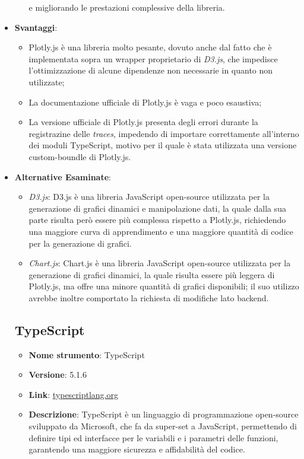 \begin{itemize}
\begin{itemize}
          e migliorando le prestazioni complessive della libreria.
\end{itemize}
\item \textbf{Svantaggi}:
\begin{itemize}
    \item Plotly.js è una libreria molto pesante, dovuto anche dal fatto che è implementata sopra un wrapper proprietario di \textit{D3.js},
          che impedisce l'ottimizzazione di alcune dipendenze non necessarie in quanto non utilizzate;
    \item La documentazione ufficiale di Plotly.js è vaga e poco esaustiva;
    \item La versione ufficiale di Plotly.js presenta degli errori durante la registrazine delle \textit{traces}, impedendo di importare correttamente
           all'interno dei moduli TypeScript, motivo per il quale è stata utilizzata una versione custom-boundle di Plotly.js.
\end{itemize}
\item \textbf{Alternative Esaminate}:
\begin{itemize}
    \item \textit{D3.js}: D3.js è una libreria JavaScript open-source utilizzata per la generazione di grafici dinamici e manipolazione dati, la quale dalla sua parte risulta però
          essere più complessa rispetto a Plotly.js, richiedendo una maggiore curva di apprendimento e una maggiore quantità di codice per la generazione di grafici.
    \item \textit{Chart.js}: Chart.js è una libreria JavaScript open-source utilizzata per la generazione di grafici dinamici, la quale risulta essere più leggera di Plotly.js,
          ma offre una minore quantità di grafici disponibili; il suo utilizzo avrebbe inoltre comportato la richiesta di modifiche lato backend.
\end{itemize}


\subsection{TypeScript}
\begin{itemize}
    \item \textbf{Nome strumento}: TypeScript
    \item \textbf{Versione}: 5.1.6
    \item \textbf{Link}: \href{https://www.typescriptlang.org/}{typescriptlang.org}
    \item \textbf{Descrizione}: TypeScript è un linguaggio di programmazione open-source sviluppato da Microsoft, che fa da super-set a JavaScript,
          permettendo di definire tipi ed interfacce per le variabili e i parametri delle funzioni, garantendo una maggiore sicurezza e affidabilità del codice.
\end{itemize}



\end{itemize}
